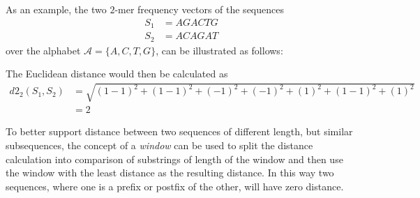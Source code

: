 \documentclass[11pt,a4paper]{article}
\begin{document}
As an example, the two $2$-mer frequency vectors of the sequences
\begin{align*}
  S_1 &= AGACTG \\
  S_2 &= ACAGAT
\end{align*}
over the alphabet $\mathcal{A} = \{A,C,T,G\}$, can be illustrated as follows:

\begin{table}[!h]
\centering
{}
\end{table}

The Euclidean distance would then be calculated as
\begin{align*}
  d2_2(S_1, S_2)
    &= \sqrt{(1-1)^2 + (1-1)^2 + (-1)^2 + (-1)^2 + (1)^2 + (1-1)^2 + (1)^2} \\
    &= 2
\end{align*}

To better support distance between two sequences of different length, but
similar subsequences, the concept of a \emph{window} can be used to split the
distance calculation into comparison of substrings of length of the window
and then use the window with the least distance as the resulting distance. In
this way two sequences, where one is a prefix or postfix of the other, will
have zero distance.
\end{document}
